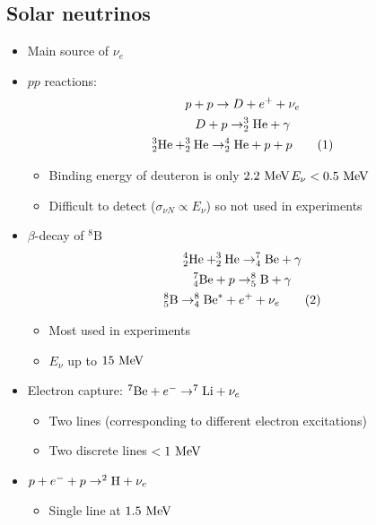 \subsection{Solar neutrinos}
\begin{itemize}
  \item Main source of $\nu_e$
  \item $pp$ reactions:
  \begin{gather*}
    p+p\rightarrow D + \pos +\nu_e \\
    D+p\rightarrow _2^3\text{He} + \gamma \\
    _2^3\text{He}+_2^3\text{He}\rightarrow _2^4\text{He}+p+p \numberthis
  \end{gather*}
  \begin{itemize}
    \item Binding energy of deuteron is only $2.2~\text{MeV}$\thus $E_\nu < 0.5 ~\text{MeV}$
    \item Difficult to detect ($\sigma_{\nu N} \propto E_\nu$) so not used in experiments
  \end{itemize}
  \item $\beta$-decay of $^8\text{B}$
  \begin{gather*}
    ^4_2\text{He}+^3_2\text{He}\rightarrow_4^7\text{Be}+\gamma\\
    _4^7\text{Be}+p\rightarrow_5^8\text{B}+\gamma\\
    _5^8\text{B}\rightarrow_4^8\text{Be}^*+\pos+\nu_e\numberthis
  \end{gather*}
  \begin{itemize}
    \item Most used in experiments
    \item $E_\nu$ up to $15~\text{MeV}$
  \end{itemize}
  \item Electron capture: $^7\text{Be}+e^{-} \rightarrow ^7\text{Li}+\nu_e$
  \begin{itemize}
    \item Two lines (corresponding to different electron excitations)
    \item Two discrete lines $<1~\text{MeV}$
  \end{itemize}
  \item $p+e^{-}+p\rightarrow ^2\text{H}+\nu_e$
  \begin{itemize}
    \item Single line at $1.5~\text{MeV}$
  \end{itemize}
\end{itemize}

